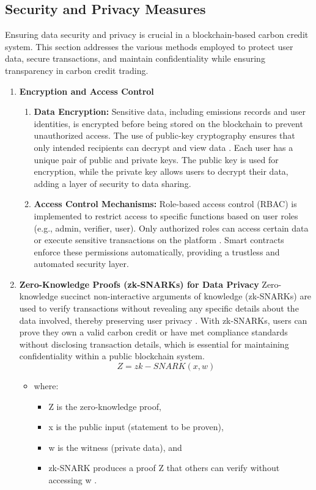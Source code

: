 \documentclass[preprint,12pt]{elsarticle}
\begin{document}
\subsection{Security and Privacy Measures}
Ensuring data security and privacy is crucial in a blockchain-based carbon credit system. This section addresses the various methods employed to protect user data, secure transactions, and maintain confidentiality while ensuring transparency in carbon credit trading.
\begin{enumerate}
    \item \textbf{Encryption and Access Control}
    \begin{enumerate}
        \item \textbf{Data Encryption:}
Sensitive data, including emissions records and user identities, is encrypted before being stored on the blockchain to prevent unauthorized access. The use of public-key cryptography ensures that only intended recipients can decrypt and view data \citep{parikh2022smart}. Each user has a unique pair of public and private keys. The public key is used for encryption, while the private key allows users to decrypt their data, adding a layer of security to data sharing.
    \item \textbf{Access Control Mechanisms:}
Role-based access control (RBAC) is implemented to restrict access to specific functions based on user roles (e.g., admin, verifier, user). Only authorized roles can access certain data or execute sensitive transactions on the platform \citep{sasson2014zerocash}.
Smart contracts enforce these permissions automatically, providing a trustless and automated security layer.
    \end{enumerate}
    \item \textbf{Zero-Knowledge Proofs (zk-SNARKs) for Data Privacy}
Zero-knowledge succinct non-interactive arguments of knowledge (zk-SNARKs) are used to verify transactions without revealing any specific details about the data involved, thereby preserving user privacy \citep{adams2018blockchain}. With zk-SNARKs, users can prove they own a valid carbon credit or have met compliance standards without disclosing transaction details, which is essential for maintaining confidentiality within a public blockchain system.
\[Z=zk-SNARK(x,w)\]
\begin{itemize}
    \item where:
    \begin{itemize}
        \item Z is the zero-knowledge proof,
        \item x is the public input (statement to be proven),
        \item w is the witness (private data), and
        \item zk-SNARK produces a proof Z that others can verify without accessing w \citep{perez2002technological}.


\end{itemize}
\end{itemize}
\end{enumerate}
\end{document}
